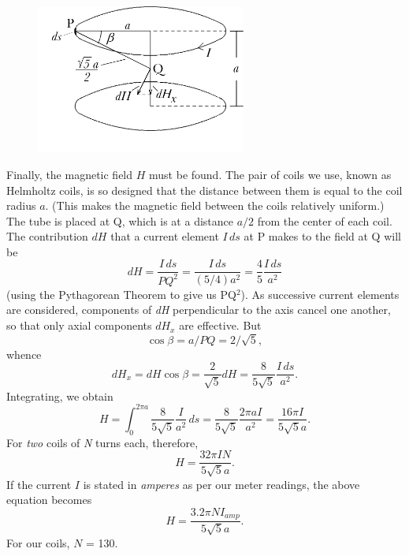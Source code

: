 \begin{figure}
  \begin{center}
    \includegraphics[width=2.72153in,height=1.93056in]{images/02_thomson/image039.png}
  \end{center}
\end{figure}


Finally, the magnetic field $H$ must be found. The pair of coils we
use, known as Helmholtz coils, is so designed that the distance between
them is equal to the coil radius $a$. (This makes the magnetic field
between the coils relatively uniform.) The tube is placed at Q,
which is at a distance $a/2$ from the center of each coil. The
contribution $dH$ that a current element $I\,ds$ at P makes to
the field at Q will be
\begin{equation*}
dH = \frac{I\,ds}{PQ^2} = \frac{I\,ds}{(5/4)a^2} = \frac{4}{5}\frac{I\,ds}{a^2}
\end{equation*}
(using the Pythagorean Theorem to give us PQ$^2$). As
successive current elements are considered, components of \emph{dH}
per\-pen\-dic\-u\-lar to the axis cancel one another, so that only axial
components $dH_x$ are effective. But
\begin{equation*}
\cos{\beta} = a/PQ = 2/\sqrt{5},
\end{equation*}
whence
\begin{equation}
dH_x = dH \cos{\beta} = \frac{2}{\sqrt{5}}dH = \frac{8}{5\sqrt{5}}\frac{I\,ds}{a^2}.\label{eq:thomson_7}
\end{equation}
Integrating, we obtain
\begin{equation*}
H = \int_{0}^{2\pi{a}} \frac{8}{5\sqrt{5}}\frac{I}{a^2}\,ds = \frac{8}{5\sqrt{5}}\frac{2\pi aI}{a^2} = \frac{16\pi I}{5\sqrt{5}a}.
\end{equation*}
For \emph{two} coils of \emph{N} turns each, therefore,
\begin{equation*}
H = \frac{32\pi IN}{5\sqrt{5}a}.
\end{equation*}
If the current $I$ is stated in \emph{amperes} as per our meter
readings, the above equation becomes
\begin{equation}
H = \frac{3.2\pi NI_{amp}}{5\sqrt{5}a}.\label{eq:thomson_8}
\end{equation}
For our coils, $N$ = 130.

